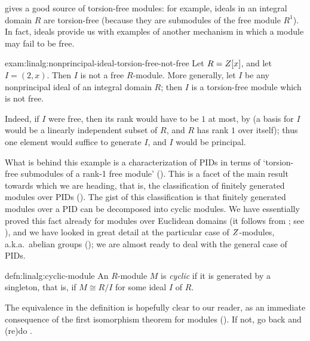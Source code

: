  gives a good source of torsion-free modules: for
example, ideals in an integral domain $R$ are torsion-free (because
they are submodules of the free module $R^1$). In fact, ideals provide
us with examples of another mechanism in which a module may fail to be
free.

\begin{exam}{}{exam:linalg:nonprincipal-ideal-torsion-free-not-free}
  Let $R = Z[x]$, and let $I = (2,x)$. Then $I$ is not a free
  $R$-module. More generally, let $I$ be any nonprincipal ideal of an
  integral domain $R$; then $I$ is a torsion-free module which is not
  free.
\end{exam}
Indeed, if $I$ were free, then its rank would have to be $1$ at most,
by  (a basis for $I$ would be a linearly independent
subset of $R$, and $R$ has rank $1$ over itself); thus one element
would suffice to generate $I$, and $I$ would be principal.

What is behind this example is a characterization of PIDs in terms of
`torsion-free submodules of a rank-1 free module'
(). This is a
facet of the main result towards which we are heading, that is, the
classification of finitely generated modules over PIDs
(). The gist of this classification is that finitely
generated modules over a PID can be decomposed into cyclic modules. We
have essentially proved this fact already for modules over Euclidean
domains (it follows from ; see
),
and we have looked in great detail at the particular case of
$Z$-modules, a.k.a.\ abelian groups
(); we are almost ready to
deal with the general case of PIDs.

\begin{defn}{}{defn:linalg:cyclic-module}
  An $R$-module $M$ is \emph{cyclic} if it is generated by a
  singleton, that is, if $M \cong R/I$ for some ideal $I$ of $R$.
\end{defn}
The equivalence in the definition is hopefully clear to our reader, as
an immediate consequence of the first isomorphism theorem for modules
(). If not, go back and (re)do
.

